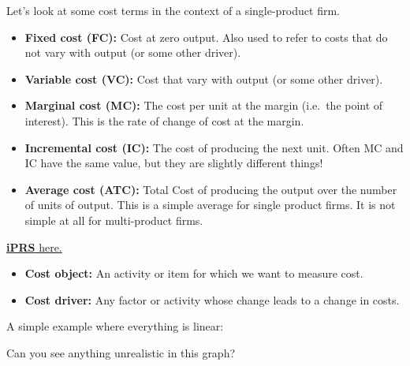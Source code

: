 \documentclass[
  ignorenonframetext,
]{beamer}
\providecommand{\tightlist}{%
  \setlength{\itemsep}{0pt}\setlength{\parskip}{0pt}}\usepackage{longtable,booktabs,array}
\begin{document}
\begin{frame}{Let's look at some cost terms in the context of a
single-product firm.}
\label{lets-look-at-some-cost-terms-in-the-context-of-a-single-product-firm.}
\end{frame}

\begin{frame}
\begin{itemize}
\tightlist
\item
  \textbf{Fixed cost (FC):} Cost at zero output. Also used to refer to
  costs that do not vary with output (or some other driver).
\item
  \textbf{Variable cost (VC):} Cost that vary with output (or some other
  driver).
\end{itemize}
\end{frame}

\begin{frame}
\begin{itemize}
\tightlist
\item
  \textbf{Marginal cost (MC):} The cost per unit at the margin (i.e.~the
  point of interest). This is the rate of change of cost at the margin.
\item
  \textbf{Incremental cost (IC):} The cost of producing the next unit.
  Often MC and IC have the same value, but they are slightly different
  things!
\item
  \textbf{Average cost (ATC):} Total Cost of producing the output over
  the number of units of output. This is a simple average for single
  product firms. It is not simple at all for multi-product firms.
\end{itemize}

\href{https://iprs.ust.hk/}{\textbf{iPRS} here.}
\end{frame}

\begin{frame}
\begin{itemize}
\tightlist
\item
  \textbf{Cost object:} An activity or item for which we want to measure
  cost.
\item
  \textbf{Cost driver:} Any factor or activity whose change leads to a
  change in costs.
\end{itemize}
\end{frame}

\begin{frame}
\begin{block}{A simple example where everything is linear:}
\label{a-simple-example-where-everything-is-linear-1}
\pause

\begin{block}{Can you see anything unrealistic in this graph?}
\label{can-you-see-anything-unrealistic-in-this-graph}
\end{block}
\end{block}
\end{frame}
\end{document}
